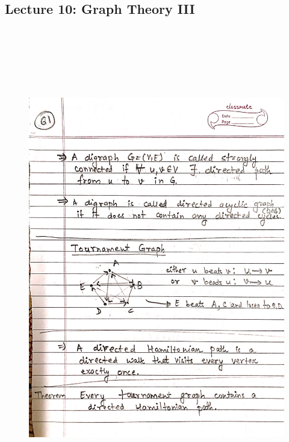 \newpage
{\color{black} \subsection*{Lecture 10: Graph Theory III}}
\begin{figure}[H]
    \centering
    \includegraphics[width=16cm, height=21cm]{"./MIT-6.042J/MIT-6042J-061"}
\end{figure}

